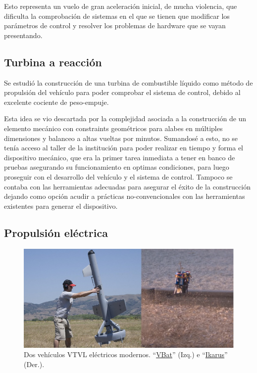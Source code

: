 Esto representa un vuelo de gran aceleración inicial, de mucha violencia, que dificulta la comprobación de sistemas en el que se tienen que modificar los parámetros de control y resolver los problemas de hardware que se vayan presentando. 

\subsection{Turbina a reacción}\label{ssec:turbina}
Se estudió la construcción de una turbina de combustible líquido como método de propulsión
del vehículo para poder comprobar el sistema de control, debido al excelente cociente de peso-empuje.

Esta idea se vio descartada por la complejidad asociada a la construcción de un elemento mecánico con constraints geométricos para alabes en múltiples dimensiones y balanceo a altas vueltas por minutos. Sumandosé a esto, no se tenía acceso al taller de la institución para poder realizar en tiempo y forma el dispositivo mecánico, que era la primer tarea inmediata a tener en banco de pruebas
asegurando su funcionamiento en optimas condiciones, para luego proseguir con el desarrollo
del vehículo y el sistema de control. Tampoco se contaba con las herramientas adecuadas para asegurar el éxito de la construcción dejando como opción acudir a prácticas no-convencionales con las herramientas existentes para generar el dispositivo.



\subsection{Propulsión eléctrica}\label{ssec:propelectrica}

\begin{figure}[htb]
    \centering
    \includegraphics[width=0.8\linewidth]{fig/vbat_icarus.png}
    \caption{Dos vehículos VTVL eléctricos modernos. ``\href{https://www.navyrecognition.com/index.php/naval-news/naval-news-archive/2020/november/9260-company-martin-uav-demonstrates-shipboard-integration-with-its-v-bat-vtol-drone.html}{VBat}'' (Izq.) e ``\href{https://hackaday.com/2018/08/31/single-rotor-drone-a-thrust-vectoring-monocopter/}{Ikarus}'' (Der.).}
    \label{fig:vbat_icarus}
\end{figure}

